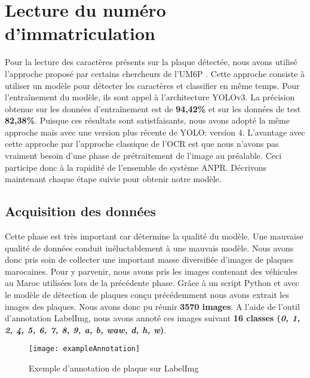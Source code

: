 \section{Lecture du numéro d'immatriculation}
Pour la lecture des caractères présents sur la plaque détectée, nous avons utilisé l’approche proposé par certains chercheurs de l’UM6P \cite{Alahyane2021OpenDF}. Cette approche consiste à utiliser un modèle pour détecter les caractères et classifier en même temps. Pour l’entraînement du modèle, ils sont appel à l’architecture YOLOv3. La précision obtenue sur les données d’entraînement est de \textbf{94,42\%} et sur les données de test \textbf{82,38\%}. Puisque ces résultats sont satistfaisants, nous avons adopté la même approche mais avec une version plus récente de YOLO: version 4. L'avantage avec cette approche par l'approche classique de l'OCR est que nous n'avons pas vraiment besoin d'une phase de prétraitement de l'image au préalable. Ceci participe donc à la rapidité de l'ensemble de système ANPR. Décrivons maintenant chaque étape suivie pour obtenir notre modèle.
    \subsection{Acquisition des données}
    Cette phase est très important car détermine la qualité du modèle. Une mauvaise qualité de données conduit inéluctablement à une mauvais modèle. Nous avons donc pris soin de collecter une important masse diversifiée d’images de plaques marocaines. Pour y parvenir, nous avons pris les images contenant des véhicules au Maroc utilisées lors de la précédente phase. Grâce à un script Python et avec le modèle de détection de plaques conçu précédemment nous avons extrait les images des plaques. Nous avons donc pu réunir \textbf{3570 images}. A l’aide de l’outil d’annotation LabelImg, nous avons annoté ces images suivant \textbf{16 classes (\textit{0, 1, 2, 4, 5, 6, 7, 8, 9, a, b, waw, d, h, w})}.
    \begin{figure}[H]
        \centering
        \texttt{[image: exampleAnnotation]}
        \caption{Exemple d'annotation de plaque sur LabelImg}
    \end{figure}
